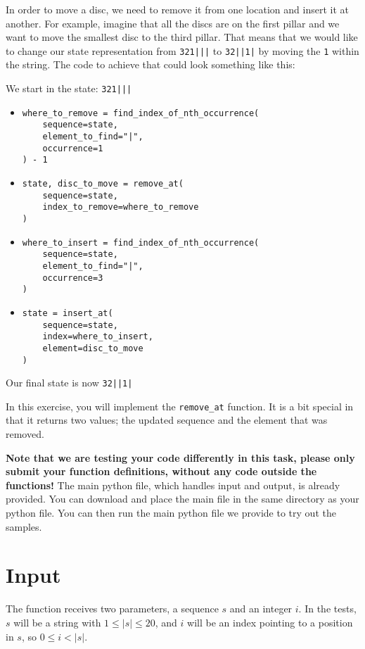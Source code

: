 
In order to move a disc, we need to remove it from one location and insert it at another.
For example, imagine that all the discs are on the first pillar and we want to move the smallest disc to the third pillar.
That means that we would like to change our state representation from \texttt{321|||} to \texttt{32||1|} by moving the \texttt{1} within the string.
The code to achieve that could look something like this:

We start in the state: \texttt{321|||}
\begin{itemize}
\item
\begin{verbatim}
where_to_remove = find_index_of_nth_occurrence(
    sequence=state,
    element_to_find="|",
    occurrence=1
) - 1
\end{verbatim}

\item 
\begin{verbatim}
state, disc_to_move = remove_at(
    sequence=state,
    index_to_remove=where_to_remove
)
\end{verbatim}

\item 
\begin{verbatim}
where_to_insert = find_index_of_nth_occurrence(
    sequence=state,
    element_to_find="|",
    occurrence=3
)
\end{verbatim}

\item 
\begin{verbatim}
state = insert_at(
    sequence=state,
    index=where_to_insert,
    element=disc_to_move
)
\end{verbatim}
\end{itemize}
Our final state is now \texttt{32||1|}

In this exercise, you will implement the \texttt{remove\_at} function.
It is a bit special in that it returns two values;
the updated sequence and the element that was removed.

\textbf{Note that we are testing your code differently in this task,
please only submit your function definitions, without any code outside the functions!}
The main python file, which handles input and output, is already provided.
You can download and place the main file in the same directory as your python file.
You can then run the main python file we provide to try out the samples.

\section*{Input}
The function receives two parameters, a sequence $s$ and an integer $i$.
In the tests, $s$ will be a string with $1 \le |s| \le 20$,
and $i$ will be an index pointing to a position in $s$, so $0 \le i < |s|$.

